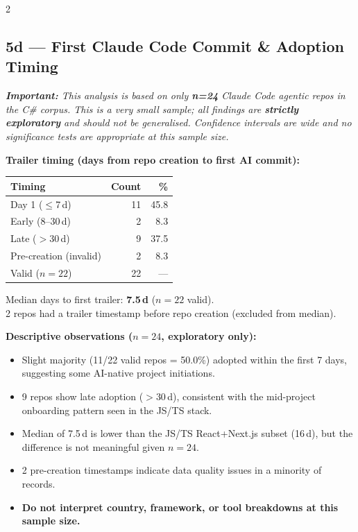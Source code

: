 \documentclass[10pt,a4paper]{article}
\begin{document}
\begin{multicols}{2}
\footnotesize

\subsection*{5d --- First Claude Code Commit \& Adoption Timing}

\textit{\textbf{Important:} This analysis is based on only \textbf{n=24} Claude Code
agentic repos in the C\# corpus. This is a very small sample; all findings are
\textbf{strictly exploratory} and should not be generalised. Confidence intervals
are wide and no significance tests are appropriate at this sample size.}

\vspace{3pt}
\textbf{Trailer timing (days from repo creation to first AI commit):}

\vspace{2pt}
\begin{tabular}{@{}lrr@{}}
\toprule
Timing & Count & \% \\
\midrule
Day 1 ($\leq$7\,d)  & 11 & 45.8 \\
Early (8--30\,d)    &  2 &  8.3 \\
Late ($>$30\,d)     &  9 & 37.5 \\
Pre-creation (invalid) & 2 & 8.3 \\
\midrule
Valid ($n=22$)      & 22 & --- \\
\bottomrule
\end{tabular}

\vspace{2pt}
Median days to first trailer: \textbf{7.5\,d} ($n=22$ valid).\\
2 repos had a trailer timestamp before repo creation (excluded from median).

\columnbreak

\textbf{Descriptive observations ($n=24$, exploratory only):}
\begin{itemize}\setlength\itemsep{0pt}
  \item Slight majority (11/22 valid repos = 50.0\%) adopted within the
        first 7 days, suggesting some AI-native project initiations.
  \item 9 repos show late adoption ($>$30\,d), consistent with the mid-project
        onboarding pattern seen in the JS/TS stack.
  \item Median of 7.5\,d is lower than the JS/TS React+Next.js subset
        (16\,d), but the difference is not meaningful given $n=24$.
  \item 2 pre-creation timestamps indicate data quality issues in a minority
        of records.
  \item \textbf{Do not interpret country, framework, or tool breakdowns
        at this sample size.}
\end{itemize}

\end{multicols}
\end{document}
